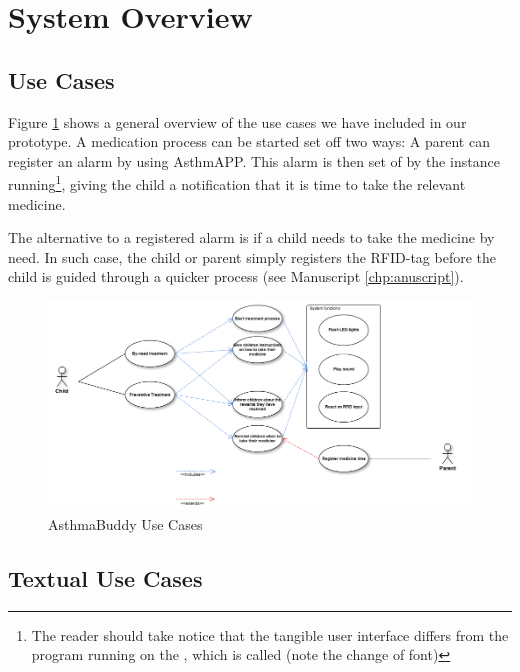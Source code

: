 \section{System Overview}
\label{sec:systemoverview}

\subsection{Use Cases}
Figure \ref{fig:pi-use-cases} shows a general overview of the use cases we have included in our prototype. A medication process can be started set off two ways:
A parent can register an alarm by using AsthmAPP. This alarm is then set of by the  instance running\footnote{The reader should take notice that the tangible user interface \ab{} differs from the program running on the \rpi{}, which is called (note the change of font)}, giving the child a notification that it is time to take the relevant medicine.

The alternative to a registered alarm is if a child needs to take the medicine by need. In such case, the child or parent simply registers the RFID-tag before the child is guided through a quicker process (see Manuscript \ref{chp:anuscript}).  

\begin{figure}[H] 
	\centering
		\includegraphics[width=0.8\paperwidth]{Pictures/usecases.png}
	\caption{AsthmaBuddy Use Cases}
	\label{fig:pi-use-cases}
\end{figure}

\subsection{Textual Use Cases}
\label{sec:textualusecasebyneed}

